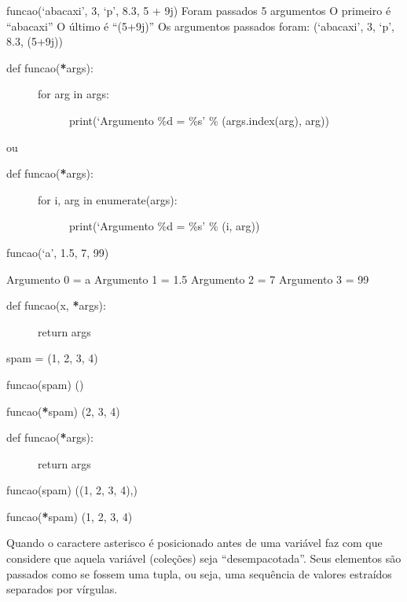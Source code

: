 \documentclass[letterpaper,10pt,brazil]{sphinxmanual}
\begin{document}
funcao(‘abacaxi’, 3, ‘p’, 8.3, 5 + 9j)
Foram passados 5 argumentos
O primeiro é “abacaxi”
O último é “(5+9j)”
Os argumentos passados foram: (‘abacaxi’, 3, ‘p’, 8.3, (5+9j))
\begin{description}
\item[{def funcao({\color{red}\bfseries{}*}args):}] \leavevmode\begin{description}
\item[{for arg in args:}] \leavevmode
print(‘Argumento \%d = \%s’ \% (args.index(arg), arg))

\end{description}

\end{description}

ou
\begin{description}
\item[{def funcao({\color{red}\bfseries{}*}args):}] \leavevmode\begin{description}
\item[{for i, arg in enumerate(args):}] \leavevmode
print(‘Argumento \%d = \%s’ \% (i, arg))

\end{description}

\end{description}

funcao(‘a’, 1.5, 7, 99)

Argumento 0 = a
Argumento 1 = 1.5
Argumento 2 = 7
Argumento 3 = 99
\begin{description}
\item[{def funcao(x, {\color{red}\bfseries{}*}args):}] \leavevmode
return args

\end{description}

spam = (1, 2, 3, 4)

funcao(spam)
()

funcao({\color{red}\bfseries{}*}spam)
(2, 3, 4)
\begin{description}
\item[{def funcao({\color{red}\bfseries{}*}args):}] \leavevmode
return args

\end{description}

funcao(spam)
((1, 2, 3, 4),)

funcao({\color{red}\bfseries{}*}spam)
(1, 2, 3, 4)

Quando o caractere asterisco é posicionado antes de uma variável faz com que considere que aquela variável (coleções) seja
“desempacotada”. Seus elementos são passados como se fossem uma tupla, ou seja, uma sequência de valores estraídos separados
por vírgulas.
\end{document}
